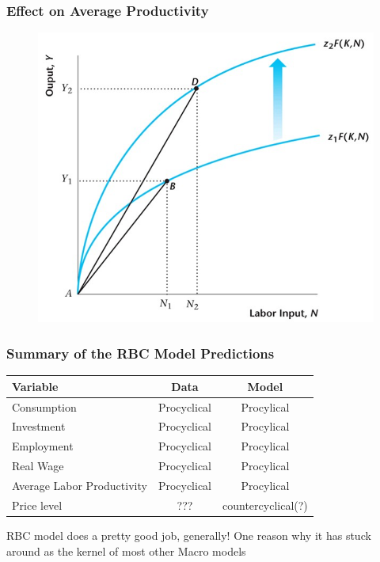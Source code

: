 \documentclass{beamer}
\begin{document}
\begin{frame}
\frametitle[alignment=center]{Effect on Average Productivity}
\begin{figure}
\centering
\includegraphics[scale=0.65]{Figures/W_Fig_13pt3.png}
\end{figure}
\end{frame}


\begin{frame}
\frametitle[alignment=center]{Summary of the RBC Model Predictions}
\begin{table}
\centering
\begin{tabular}{lcc}
\hline\hline
Variable & Data & Model \\
\hline
Consumption & Procyclical & Procylical \\
Investment & Procyclical & Procylical \\
Employment & Procyclical & Procylical \\
Real Wage & Procyclical & Procylical \\
Average Labor Productivity & Procyclical & Procylical \\
Price level & ??? & countercyclical(?) \\
\hline\hline
\end{tabular}
\end{table}
RBC model does a pretty good job, generally!  One reason why it has stuck around as the kernel of most other Macro models
\end{frame}
\end{document}

